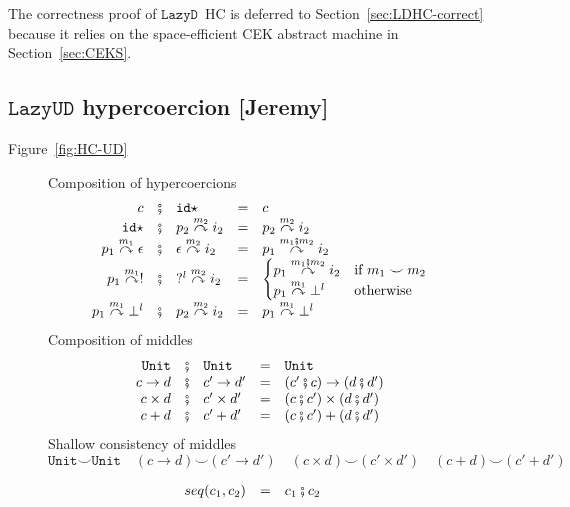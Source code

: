 \documentclass[acmsmall,review,anonymous]{acmart}\settopmatter{printfolios=true,printccs=false,printacmref=false}
\newcommand{\secref}[1]{Section~\ref{#1}}
\newcommand{\funrule}[3]{#1 &=& #2 & #3\\}
\newcommand{\lazyUD}{$\mathtt{Lazy UD}$}
\newcommand{\lazyD}{$\mathtt{Lazy D}$}
\newcommand{\POOunit}[0]{\mathtt{Unit}}
\newcommand{\hyperCoercionI}[0]{\mathtt{id\star}}
\newcommand{\hyperCoercionC}[3]{#1 \overset{#2}{\curvearrowright} #3}
\begin{document}
The correctness proof of \lazyD\ HC is deferred to \secref{sec:LDHC-correct} 
because it relies on the space-efficient CEK abstract machine in 
\secref{sec:CEKS}.

\subsection{\lazyUD{} hypercoercion [Jeremy]}


Figure~\ref{fig:HC-UD}

\begin{figure}
  Composition of hypercoercions 
  \[
  \begin{array}{rclclr}
  c &\fatsemi& \hyperCoercionI{} &=& c\\
  \hyperCoercionI{} &\fatsemi& \hyperCoercionC{p_2}{m_2}{i_2} &=&
       \hyperCoercionC{p_2}{m_2}{i_2} \\
  \hyperCoercionC{p_1}{m_1}{\epsilon} &\fatsemi& \hyperCoercionC{\epsilon}{m_2}{i_2} &=&
       \hyperCoercionC{p_1}{m_1 \fatsemi m_2}{i_2} \\
  \hyperCoercionC{p_1}{m_1}{!} &\fatsemi& \hyperCoercionC{?^l}{m_2}{i_2} &=&
  \begin{cases}
    \hyperCoercionC{p_1}{m_1 \fatsemi m_2}{i_2} & \text{if } m_1 \smile m_2 \\
    \hyperCoercionC{p_1}{m_1}{\bot^l} & \text{otherwise}
  \end{cases} \\
  \hyperCoercionC{p_1}{m_1}{\bot^l} &\fatsemi& \hyperCoercionC{p_2}{m_2}{i_2} &=&
     \hyperCoercionC{p_1}{m_1}{\bot^l}
  \end{array}
  \]
  Composition of middles 
  \[
  \begin{array}{rclclr}  
  \POOunit &\fatsemi& \POOunit &=& \POOunit \\
  c \to d &\fatsemi& c' \to d' &=& (c' \fatsemi c) \to (d \fatsemi d') \\
  c \times d &\fatsemi& c' \times d' &=& (c \fatsemi c') \times (d \fatsemi d') \\
  c + d &\fatsemi& c' + d' &=& (c \fatsemi c') + (d \fatsemi d')
  \end{array}
  \]
  Shallow consistency of middles 
  \[
  \POOunit \smile \POOunit \quad
  (c \to d) \smile (c' \to d') \quad
  (c \times d) \smile (c' \times d') \quad
  (c + d) \smile (c' + d')
  \]

  \[
  \begin{array}{rclr}
    \funrule{seq(c_1,c_2)}{
      c_1 \fatsemi c_2
    }{}
  \end{array}
  \]
  

\end{figure}
\end{document}
